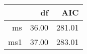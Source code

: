 \begin{table}[ht]
\centering
\begin{tabular}{rrr}
  \hline
 & df & AIC \\ 
  \hline
ms & 36.00 & 281.01 \\ 
  ms1 & 37.00 & 283.01 \\ 
   \hline
\end{tabular}
\end{table}
